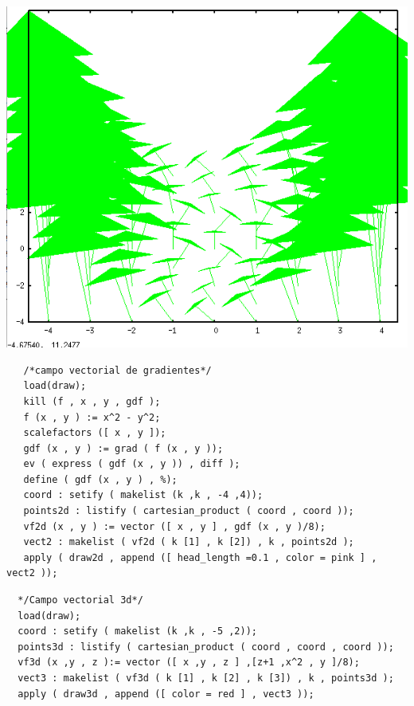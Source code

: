 \documentclass[12pt]{article}
\begin{document}
  \includegraphics[scale=0.4]{actividad84.png}
   
   \begin{verbatim}
   /*campo vectorial de gradientes*/
   load(draw);
   kill (f , x , y , gdf );
   f (x , y ) := x^2 - y^2;
   scalefactors ([ x , y ]);
   gdf (x , y ) := grad ( f (x , y ));
   ev ( express ( gdf (x , y )) , diff );
   define ( gdf (x , y ) , %);
   coord : setify ( makelist (k ,k , -4 ,4));
   points2d : listify ( cartesian_product ( coord , coord ));
   vf2d (x , y ) := vector ([ x , y ] , gdf (x , y )/8);
   vect2 : makelist ( vf2d ( k [1] , k [2]) , k , points2d );
   apply ( draw2d , append ([ head_length =0.1 , color = pink ] , vect2 ));
   \end{verbatim}
   
  \begin{verbatim}
  */Campo vectorial 3d*/
  load(draw);
  coord : setify ( makelist (k ,k , -5 ,2));
  points3d : listify ( cartesian_product ( coord , coord , coord ));
  vf3d (x ,y , z ):= vector ([ x ,y , z ] ,[z+1 ,x^2 , y ]/8);
  vect3 : makelist ( vf3d ( k [1] , k [2] , k [3]) , k , points3d );
  apply ( draw3d , append ([ color = red ] , vect3 ));
  \end{verbatim}
  
\end{document}
